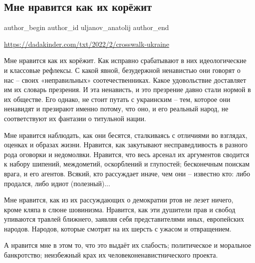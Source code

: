  
 
 
 
 
 
\subsection{Мне нравится как их корёжит}
\label{sec:19_02_2022.fb.uljanov_anatolij.1.mne_nravitsja_kak_ih_korezhit}
 
\ifcmt
 author_begin
   author_id uljanov_anatolij
 author_end
\fi

\url{https://dadakinder.com/txt/2022/2/crosswalk-ukraine}

Мне нравится как их корёжит. Как исправно срабатывают в них идеологические и
классовые рефлексы. С какой явной, безудержной ненавистью они говорят о нас –
своих «неправильных» соотечественниках. Какое удовольствие доставляет им их
словарь презрения. И эта ненависть, и это презрение давно стали нормой в их
обществе. Его однако, не стоит путать с украинским – тем, которое они ненавидят
и презирают именно потому, что оно, и его реальный народ, не соответствуют их
фантазии о титульной нации.


Мне нравится наблюдать, как они бесятся, сталкиваясь с отличиями во взглядах,
оценках и образах жизни. Нравится, как закутывают несправедливость в разного
рода оговорки и недомолвки. Нравится, что весь арсенал их аргументов сводится к
набору шипений, междометий, оскорблений и глупостей; бесконечным поискам врага,
и его агентов. Всякий, кто рассуждает иначе, чем они – известно кто: либо
продался, либо идиот (полезный)...

Мне нравится, как из их рассуждающих о демократии ртов не лезет ничего, кроме
кляпа в слюне шовинизма. Нравится, как эти душители прав и свобод упиваются
травлей ближнего, заявляя себя представителями иных, европейских народов.
Народов, которые смотрят на их шерсть с ужасом и отвращением.

А нравится мне в этом то, что это выдаёт их слабость; политическое и моральное
банкротство; неизбежный крах их человеконенавистнического проекта.


